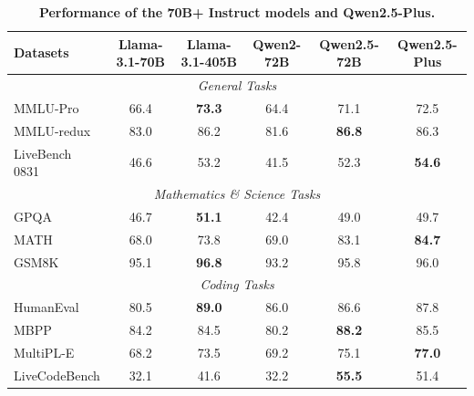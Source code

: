 \begin{table}[tbp]

\centering

\caption{\textbf{Performance of the 70B+ Instruct models and Qwen2.5-Plus.}}

\label{tab:70b_instruct}
\small
\setlength{\tabcolsep}{2.6pt}

\begin{tabular}{@{}lccccc@{}}

\toprule

\textbf{Datasets}  & \textbf{Llama-3.1-70B} & \textbf{Llama-3.1-405B} & \textbf{Qwen2-72B} & \textbf{Qwen2.5-72B} & \textbf{Qwen2.5-Plus} \\

\midrule

\multicolumn{6}{c}{\textit{General Tasks}} \\
\midrule

MMLU-Pro  & 66.4 & \textbf{73.3} & 64.4 & 71.1 & 72.5 \\

MMLU-redux  & 83.0 & 86.2 & 81.6 & \textbf{86.8} & 86.3\\

LiveBench 0831  & 46.6 & 53.2 & 41.5 & 52.3 & \textbf{54.6}\\

\midrule
\multicolumn{6}{c}{\textit{Mathematics \& Science Tasks}} \\
\midrule

GPQA   & 46.7 & \textbf{51.1} & 42.4 & 49.0 & 49.7\\

MATH   & 68.0 & 73.8 & 69.0 & 83.1 & \textbf{84.7}\\

GSM8K  & 95.1 & \textbf{96.8} & 93.2 & 95.8 & 96.0\\

\midrule
\multicolumn{6}{c}{\textit{Coding Tasks}} \\
\midrule

HumanEval  & 80.5 & \textbf{89.0} & 86.0 & 86.6 & 87.8\\

MBPP  & 84.2 & 84.5 & 80.2 & \textbf{88.2} & 85.5\\

MultiPL-E  & 68.2 & 73.5 & 69.2 & 75.1 & \textbf{77.0}  \\

LiveCodeBench  & 32.1 & 41.6 & 32.2 & \textbf{55.5} & 51.4\\


\end{tabular}
\end{table}
